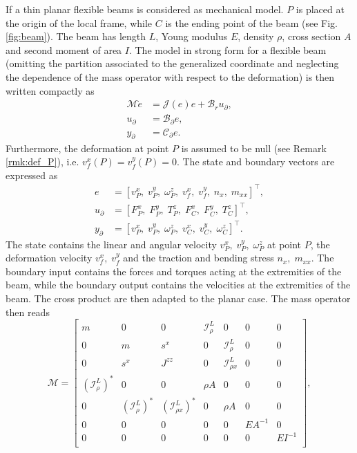 If a thin planar flexible beams is considered as mechanical model. $P$ is placed at the origin of the local frame, while $C$ is the ending point of the beam (see Fig. \ref{fig:beam}). The beam has length $L$, Young modulus $E$, density $\rho$, cross section $A$ and second moment of area $I$. The model in strong form for a flexible beam (omitting the partition associated to the generalized coordinate and neglecting the dependence of the mass operator with respect to the deformation) is then written compactly as 
\begin{equation}
\label{eq:EB_str_phdae}
\begin{aligned}
\mathcal{M} \dot{e} &= \mathcal{J}(e) e + \mathcal{B}_r u_\partial, \\
u_\partial &= \mathcal{B}_{\partial} e, \\
y_\partial &= \mathcal{C}_{\partial} e.
\end{aligned}
\end{equation}
Furthermore, the deformation at point $P$ is assumed to be null (see Remark \ref{rmk:def_P}), i.e. $v_f^x(P) = v_f^y(P) = 0$. The state and boundary vectors are expressed as
\begin{align*}
e &= [v_P^x, \; v_P^y, \; \omega_P^z, \; v_f^x, \; v_f^y, \; n_x, \; m_{xx}]^\top, \\
u_\partial &=  [F_{P}^x, \; F_{P}^y, \; T_{P}^z, \; F_{C}^x, \; F_{C}^y, \; T_{C}^z]^\top, \\
y_\partial &=  [v_{P}^x, \; v_{P}^y, \; \omega_{P}^z, \; v_{C}^x, \; v_{C}^y, \; \omega_{C}^z]^\top.
\end{align*}
The state contains the linear and angular velocity $v_P^x, \; v_P^y, \; \omega_P^z$ at point $P$, the deformation velocity $ v_f^x, \; v_f^y$ and the traction and bending stress $n_x, \; m_{xx}$. The boundary input contains the forces and torques acting at the extremities of the beam, while the boundary output contains the velocities at the extremities of the beam.
The cross product are then adapted to the planar case. The mass operator then reads
\begin{equation}
\label{eq:EB_M}
\mathcal{M} = 
\begin{bmatrix}
m & 0 & 0 & \mathcal{I}_\rho^L & 0 & 0 & 0 \\
0 & m & s^x & 0 & \mathcal{I}_\rho^L & 0 & 0 \\
0 & s^x & J^{zz} & 0 & \mathcal{I}_{\rho x}^{L} & 0 & 0 \\
(\mathcal{I}_\rho^{L})^* & 0 & 0 & \rho A & 0 & 0 & 0  \\
0 & (\mathcal{I}_\rho^{L})^* & (\mathcal{I}_{\rho x}^{L})^* & 0 & \rho A & 0 & 0  \\
0 & 0 & 0 & 0 & 0 & {EA}^{-1} & 0 \\
0 & 0 & 0 & 0 & 0 & 0 & {EI}^{-1} \\
\end{bmatrix},
\end{equation}
